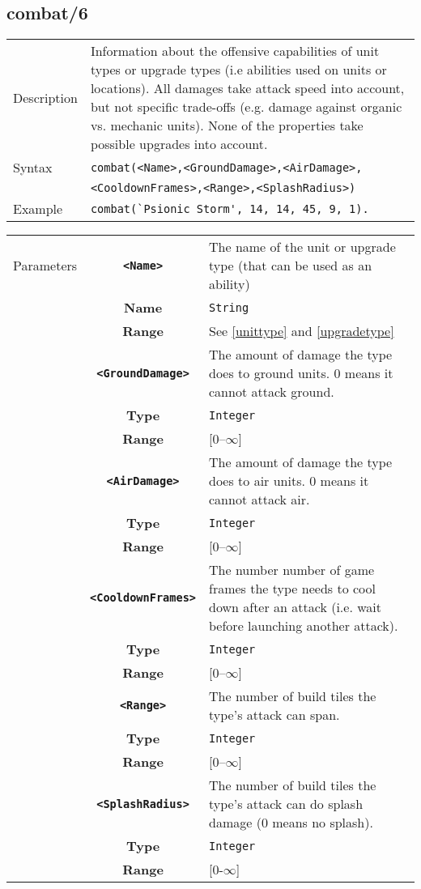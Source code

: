 \subsection{combat/6}
\begin{tabularx}{\textwidth}{lX}
 Description & Information about the offensive capabilities of unit types or upgrade types (i.e abilities used on units or locations). All damages take attack speed into account, but not specific trade-offs (e.g. damage against organic vs. mechanic units). None of the properties take possible upgrades into account. \\
 Syntax & \verb|combat(<Name>,<GroundDamage>,<AirDamage>,| \\ & \quad \verb|<CooldownFrames>,<Range>,<SplashRadius>)| \\
 Example & \verb|combat(`Psionic Storm', 14, 14, 45, 9, 1).| \\
 \end{tabularx}
 \begin{tabularx}{\textwidth}{l | c | p{8cm}|}
 \cline{2-3}
 Parameters & \textbf{\verb|<Name>|} & The name of the unit or upgrade type (that can be used as an ability)\\
            & \textbf{Name} & \verb|String| \\
            & \textbf{Range} & See \ref{unittype} and \ref{upgradetype} \\
            \cline{2-3}
            & \textbf{\verb|<GroundDamage>|} & The amount of damage the type does to ground units. 0 means it cannot attack ground. \\
            & \textbf{Type} & \verb|Integer| \\
            & \textbf{Range} & [0--$\infty$] \\
            \cline{2-3}
            & \textbf{\verb|<AirDamage>|} & The amount of damage the type does to air units. 0 means it cannot attack air. \\
            & \textbf{Type} & \verb|Integer| \\
            & \textbf{Range} & [0--$\infty$] \\
            \cline{2-3}
            & \textbf{\verb|<CooldownFrames>|} & The number number of game frames the type needs to cool down after an attack (i.e. wait before launching another attack).\\
            & \textbf{Type} & \verb|Integer| \\
            & \textbf{Range} & [0--$\infty$] \\
            \cline{2-3}
            & \textbf{\verb|<Range>|} & The number of build tiles the type's attack can span. \\
            & \textbf{Type} & \verb|Integer| \\
            & \textbf{Range} & [0--$\infty$] \\
            \cline{2-3}
            & \textbf{\verb|<SplashRadius>|} & The number of build tiles the type's attack can do splash damage (0 means no splash).\\
            & \textbf{Type} & \verb|Integer| \\
            & \textbf{Range} & [0-$\infty$] \\
            \cline{2-3}
\end{tabularx}